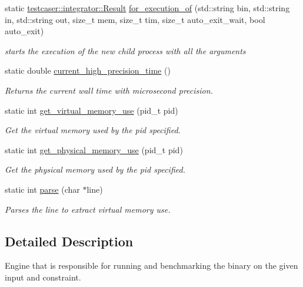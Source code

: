 \begin{DoxyCompactItemize}
\item 
static \mbox{\hyperlink{classtestcaser_1_1integrator_1_1Result}{testcaser\+::integrator\+::\+Result}} \mbox{\hyperlink{structtestcaser_1_1internal_1_1executor__engine_a51f467bc2013c188b5e4454fa919ea70}{for\+\_\+execution\+\_\+of}} (std\+::string bin, std\+::string in, std\+::string out, size\+\_\+t mem, size\+\_\+t tim, size\+\_\+t auto\+\_\+exit\+\_\+wait, bool auto\+\_\+exit)
\begin{DoxyCompactList}\small\item\em starts the execution of the new child process with all the arguments \end{DoxyCompactList}\item 
static double \mbox{\hyperlink{structtestcaser_1_1internal_1_1executor__engine_af3546e4b21e46fc05bb38f014a88ed6f}{current\+\_\+high\+\_\+precision\+\_\+time}} ()
\begin{DoxyCompactList}\small\item\em Returns the current wall time with microsecond precision. \end{DoxyCompactList}\item 
static int \mbox{\hyperlink{structtestcaser_1_1internal_1_1executor__engine_ab70c6b9356bc0dbaf138aa017b048e8a}{get\+\_\+virtual\+\_\+memory\+\_\+use}} (pid\+\_\+t pid)
\begin{DoxyCompactList}\small\item\em Get the virtual memory used by the pid specified. \end{DoxyCompactList}\item 
static int \mbox{\hyperlink{structtestcaser_1_1internal_1_1executor__engine_a7162cc64fce4440e029086bf4f1efc7f}{get\+\_\+physical\+\_\+memory\+\_\+use}} (pid\+\_\+t pid)
\begin{DoxyCompactList}\small\item\em Get the physical memory used by the pid specified. \end{DoxyCompactList}\item 
static int \mbox{\hyperlink{structtestcaser_1_1internal_1_1executor__engine_a80ed3584cab00a573de09502df329919}{parse}} (char $\ast$line)
\begin{DoxyCompactList}\small\item\em Parses the line to extract virtual memory use. \end{DoxyCompactList}\end{DoxyCompactItemize}


\subsection{Detailed Description}
Engine that is responsible for running and benchmarking the binary on the given input and constraint. 

